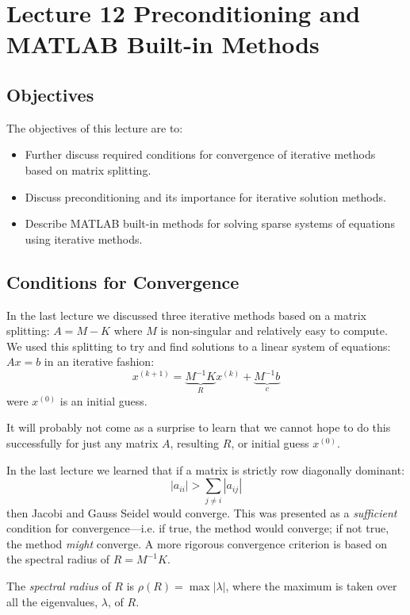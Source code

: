 \chapter{Lecture 12 Preconditioning and MATLAB Built-in Methods}
\label{ch:lec12n}
\section{Objectives}
The objectives of this lecture are to:
\begin{itemize}
\item Further discuss required conditions for convergence of iterative methods based on matrix splitting.
\item Discuss preconditioning and its importance for iterative solution methods.
\item Describe MATLAB built-in methods for solving sparse systems of equations using iterative methods.
\end{itemize}
\setcounter{lstannotation}{0}

\section{Conditions for Convergence}
In the last lecture we discussed three iterative methods based on a matrix splitting: $A = M-K$ where $M$ is non-singular and relatively easy to compute.  We used this splitting to try and find solutions to a linear system of equations: $Ax = b$ in an iterative fashion:
\begin{equation*}
x^{(k+1)} = \underbrace{M^{-1}K}_{R}x^{(k)} + \underbrace{M^{-1}b}_{c}
\end{equation*}
were $x^{(0)}$ is an initial guess.

It will probably not come as a surprise to learn that we cannot hope to do this successfully for just any matrix $A$, resulting $R$, or initial guess $x^{(0)}$.

In the last lecture we learned that if a matrix is strictly row diagonally dominant:
\begin{equation*}
|a_{ii}| > \sum\limits_{j \ne i} |a_{ij}|
\end{equation*}
then Jacobi and Gauss Seidel would converge.  This was presented as a \emph{sufficient} condition for convergence---i.e. if true, the method would converge; if not true, the method \emph{might} converge.  A more rigorous convergence criterion is based on the spectral radius of $R = M^{-1}K$.\cite{demmel1997applied}

\begin{definition}
The \emph{spectral radius} of $R$ is $\rho(R) = \max{|\lambda|}$, where the maximum is taken over all the eigenvalues, $\lambda$, of $R$.
\end{definition} 

